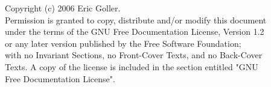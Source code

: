 
%
%




Copyright (c)  2006 Eric Goller.\\
Permission is granted to copy, distribute and/or modify this document\\
under the terms of the GNU Free Documentation License, Version 1.2\\
or any later version published by the Free Software Foundation;\\
with no Invariant Sections, no Front-Cover Texts, and no Back-Cover\\
Texts.  A copy of the license is included in the section entitled "GNU\\
Free Documentation License".\\

\maketitle
\newpage
%
\tableofcontents



\appendix





